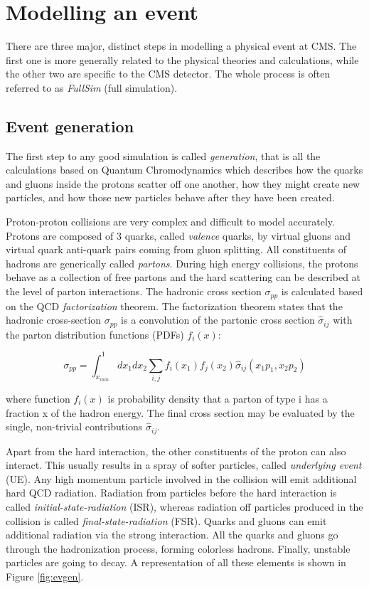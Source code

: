 \section{Modelling an event} \label{sec:modelling}

There are three major, distinct steps in modelling a physical event at CMS. The first one is more generally related to the physical theories and calculations, while the other two are specific to the CMS detector. The whole process is often referred to as \emph{FullSim} (full simulation).

\subsection{Event generation}

The first step to any good simulation is called \emph{generation}, that is all the calculations based on Quantum Chromodynamics which describes how the quarks and gluons inside the protons scatter off one another, how they might create new particles, and how those new particles behave after they have been created. 

Proton-proton collisions are very complex and difficult to model accurately. Protons are
composed of 3 quarks, called \emph{valence} quarks, by virtual gluons and virtual quark anti-quark
pairs coming from gluon splitting. All constituents of hadrons are generically called \emph{partons}.
During high energy collisions, the protons behave as a collection of free partons and the
hard scattering can be described at the level of parton interactions. The hadronic cross
section $\sigma_{pp}$ is calculated based on the QCD \emph{factorization} theorem. The factorization theorem
states that the hadronic cross-section $\sigma_{pp}$ is a convolution of the partonic cross section  $\hat{\sigma}_{ij}$ with the parton distribution functions (PDFs) $f_i(x)$:

\[
\sigma_{pp} = \int_{x_{min}}^1 dx_1 dx_2 \sum_{i,j}f_i(x_1)f_j(x_2)\hat{\sigma}_{ij}(x_1 p_1, x_2 p_2)
\]

where function $f_i(x)$ is probability density that a parton of type i has a fraction x of the
hadron energy. The final cross section may be evaluated by the single, non-trivial contributions $\hat{\sigma}_{ij}$.

Apart from the hard interaction, the other constituents of the proton can also interact. This
usually results in a spray of softer particles, called \emph{underlying event} (UE). Any high momentum particle involved in the collision will emit additional hard QCD radiation. Radiation
from particles before the hard interaction is called \emph{initial-state-radiation} (ISR), whereas radiation off particles produced in the collision is called \emph{final-state-radiation} (FSR). Quarks and gluons can emit additional radiation via the strong interaction. All the quarks
and gluons go through the hadronization process, forming colorless hadrons. Finally, unstable particles are going to decay. A representation of all these elements is shown in Figure \ref{fig:evgen}.          

